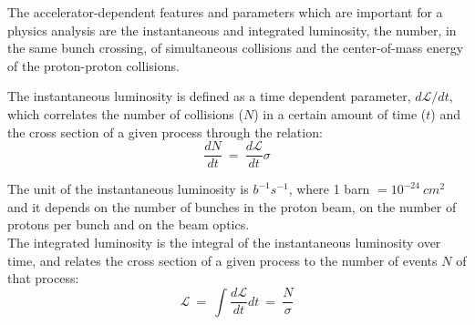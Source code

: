 The accelerator-dependent features and parameters which are important for a
physics analysis are the instantaneous and integrated luminosity, the
number, in the same bunch crossing, of simultaneous collisions and the
center-of-mass energy of the proton-proton collisions.

The instantaneous luminosity is defined as a time dependent
parameter, $d\mathcal{L}/dt$, which correlates the number of collisions
($N$) in a certain amount of time ($t$) and the cross section of a
given process through the relation:
\begin{equation}
\label{eq:instalumi}
\frac{dN}{dt} \: = \: \frac{d\mathcal{L}}{dt}\sigma
\end{equation}

The unit of the instantaneous luminosity is $b^{-1}s^{-1}$, where 1
barn $= 10^{-24} \ cm^2$ and it depends on the number of bunches in
the proton beam, on the number of protons per bunch and on the beam
optics. \\
The integrated luminosity is the integral of the instantaneous
luminosity over time, and relates the cross section of a
given process to the number of events $N$ of that process:
\begin{equation}
\label{eq:intelumi}
\mathcal{L} \:=\: \int \frac{d\mathcal{L}}{dt} dt \: = \: \frac{N}{\sigma}
\end{equation}


